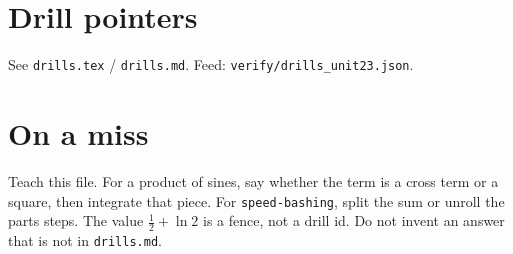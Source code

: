 \section{Drill pointers}
See \texttt{drills.tex} / \texttt{drills.md}. Feed: \texttt{verify/drills\_unit23.json}.

\section*{On a miss}
Teach this file. For a product of sines, say whether the term is a cross term or a square, then integrate that piece. For \texttt{speed-bashing}, split the sum or unroll the parts steps. The value $\frac12+\ln 2$ is a fence, not a drill id. Do not invent an answer that is not in \texttt{drills.md}.

